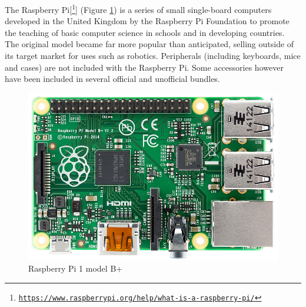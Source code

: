 The Raspberry Pi[\footnote{\href{https://www.raspberrypi.org/help/what-is-a-raspberry-pi/}{\texttt{https://www.raspberrypi.org/help/what-is-a-raspberry-pi/}}}] (Figure \ref{fig:raspberry})  is a series of small single-board computers developed in the United Kingdom by the Raspberry Pi Foundation to promote the teaching of basic computer science in schools and in developing countries. The original model became far more popular than anticipated, selling outside of its target market for uses such as robotics. Peripherals (including keyboards, mice and cases) are not included with the Raspberry Pi. Some accessories however have been included in several official and unofficial bundles.
\begin{figure}[h]
	\centering
	\includegraphics[width=0.5\linewidth]{images/raspberrypi.jpg}
	\caption{Raspberry Pi 1 model B+}
	\label{fig:raspberry}
\end{figure}